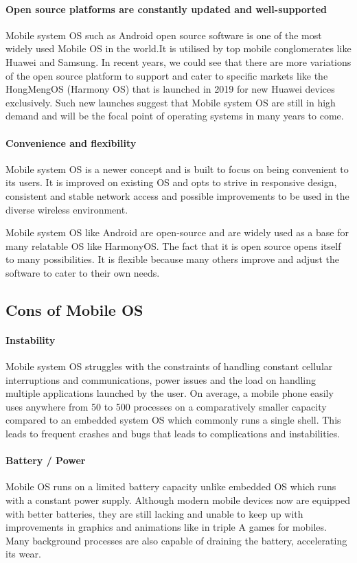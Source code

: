 \documentclass[conference]{IEEEtran}
\begin{document}
\paragraph{Open source platforms are constantly updated and well-supported}
Mobile  system OS such as Android open source software is one of the most widely used Mobile OS in the world.It is utilised by top mobile conglomerates like Huawei and Samsung. In recent years, we could see that there are more variations of the open source platform to support and cater to specific markets like the HongMengOS (Harmony OS) that is launched in 2019 for new Huawei devices exclusively\cite{HuaweiHongmeng}. Such new launches suggest that Mobile system OS are still in high demand and will be the focal point of operating systems in many years to come.

\paragraph{Convenience and flexibility}
Mobile  system OS is a newer concept and is built to focus on being convenient to its users. It is improved on existing OS and opts to strive in responsive design, consistent and stable network access and possible improvements to be used in the diverse wireless environment\cite{technopedia}.

Mobile system OS like Android are open-source and are widely used as a base for many relatable OS like HarmonyOS. The fact that it is open source opens itself to many possibilities. It is flexible because many others improve and adjust the software to cater to their own needs.

\subsection{Cons of Mobile OS}
\paragraph{Instability}
Mobile system OS struggles with the constraints of handling constant cellular interruptions and communications, power issues and the load on handling multiple applications launched by the user\cite{AAWP}. On average, a mobile phone easily uses anywhere from 50 to 500 processes on a comparatively smaller capacity compared to an embedded system OS which commonly runs a single shell. This leads to frequent crashes and bugs that leads to complications and instabilities.

\paragraph{Battery / Power}
Mobile OS runs on a limited battery capacity unlike embedded OS which runs with a constant power supply. Although modern mobile devices now are equipped with better batteries, they are still lacking and unable to keep up with improvements in graphics and animations like in triple A games for mobiles. Many background processes are also capable of draining the battery, accelerating its wear.
\end{document}
